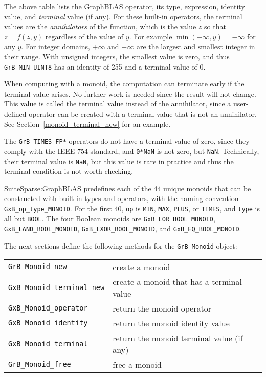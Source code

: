 \documentclass[12pt]{article}
\begin{document}
The above table lists the GraphBLAS operator, its type, expression, identity
value, and {\em terminal} value (if any).  For these built-in operators, the
terminal values are the {\em annihilators} of the function, which is the value
$z$ so that $z=f(z,y)$ regardless of the value of $y$.  For example
$\min(-\infty,y) = -\infty$ for any $y$.  For integer domains, $+\infty$ and
$-\infty$ are the largest and smallest integer in their range.  With unsigned
integers, the smallest value is zero, and thus \verb'GrB_MIN_UINT8' has an
identity of 255 and a terminal value of 0.

When computing with a monoid, the computation can terminate early if the
terminal value arises.  No further work is needed since the result will not
change.  This value is called the terminal value instead of the annihilator,
since a user-defined operator can be created with a terminal value that is not
an annihilator.  See Section~\ref{monoid_terminal_new} for an example.

The \verb'GrB_TIMES_FP*' operators do not have a terminal value of zero, since
they comply with the IEEE 754 standard, and \verb'0*NaN' is not zero, but
\verb'NaN'.  Technically, their terminal value is \verb'NaN', but this value is
rare in practice and thus the terminal condition is not worth checking.

SuiteSparse:GraphBLAS predefines each of the 44 unique monoids that can be
constructed with built-in types and operators, with the naming convention
\verb'GxB_op_type_MONOID'.  For the first 40, \verb'op' is \verb'MIN',
\verb'MAX', \verb'PLUS', or \verb'TIMES', and \verb'type' is all but
\verb'BOOL'.  The four Boolean monoids are \verb'GxB_LOR_BOOL_MONOID',
\verb'GxB_LAND_BOOL_MONOID', \verb'GxB_LXOR_BOOL_MONOID', and
\verb'GxB_EQ_BOOL_MONOID'.

The next sections define the following methods for the \verb'GrB_Monoid'
object:

\vspace{0.2in}
{\footnotesize
\begin{tabular}{ll}
\hline
\verb'GrB_Monoid_new'       & create a monoid \\
\verb'GxB_Monoid_terminal_new'  & create a monoid that has a terminal value\\
\verb'GxB_Monoid_operator'  & return the monoid operator \\
\verb'GxB_Monoid_identity'  & return the monoid identity value \\
\verb'GxB_Monoid_terminal'  & return the monoid terminal value (if any) \\
\verb'GrB_Monoid_free'      & free a monoid \\
\hline
\end{tabular}
}
\vspace{0.2in}
\end{document}

